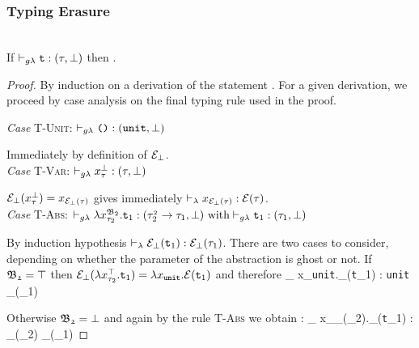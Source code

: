 \subsubsection{Typing Erasure}
\begin{lemma}~ \\
	If  $\vdash_{g\lambda} \texttt{t} : (\tau, \bot)$  
	then .
\end{lemma}
\begin{proof}
By induction on a derivation of the statement 
. 
For a given derivation, we proceed by case analysis on the final typing rule
 used in the proof. 
 
 	\noindent\textit{Case} \textsc{T-Unit}:\quad 
 	$\vdash_{g\lambda} \texttt{()} : (\texttt{unit}, \bot)$
 	
 	Immediately by definition of $\mathcal{E}_{\bot}$.\\[0.08cm] 
 	\noindent\textit{Case} \textsc{T-Var}:\quad 
 	$\vdash_{g\lambda} x_{\tau}^{\bot} : (\tau, \bot)$
 	 
 	 $\mathcal{E}_{\bot}(x_{\tau}^{\bot}) = x_{\mathcal{E}_{\bot}(\tau)}$ gives  immediately 
 	 $\vdash_{\lambda} x_{\mathcal{E}_{\bot}(\tau)} : \mathcal{E}(\tau)$.\\[0.08cm] 
 	\noindent\textit{Case} \textsc{T-Abs}:\quad
 		$\vdash_{g\lambda} \lambda x_{\tau_{2}}^{\mathfrak{B}_{2}}.\texttt{t}_{1} : (\tau_{2}^{_{2}} \rightarrow 
 		\tau_{1}, \bot)~ \text{with} \vdash_{g\lambda} \texttt{t}_{1} : (\tau_{1}, \bot)	$
 		
 		By induction hypothesis $\vdash_{\lambda} \mathcal{E}_{\bot}(\texttt{t}_{1}) : \mathcal{E}_{\bot}(\tau_{1}) $.
 		There are two cases to consider, depending on whether the parameter 
 		of the abstraction is ghost or not. If $\mathfrak{B_{2} = \top}$ then 
 		$\mathcal{E}_{\bot}(\lambda x_{\tau_{2}}^{\top}. \texttt{t}_{1}) = \lambda x_{\texttt{unit}}. \mathcal{E}(\texttt{t}_{1})$
 		and therefore
 		{ \vdash_{\lambda} \lambda x_{\texttt{unit}}.\e_{\bot}(\texttt{t}_{1}) : 
 		\texttt{unit} \rightarrow 	\e_{\bot}(\tau_{1})} 
 	
 		Otherwise $\mathfrak{B_{2} = \bot}$ and again by the rule \textsc{T-Abs} 
 		we obtain :
 		{ \vdash_{\lambda} \lambda x_{\e_{\bot}(\tau_{2})}.\e_{\bot}(\texttt{t}_{1}) : 
 		\e_{\bot}(\tau_{2}) \rightarrow 	\e_{\bot}(\tau_{1})}
 		

\end{proof}
